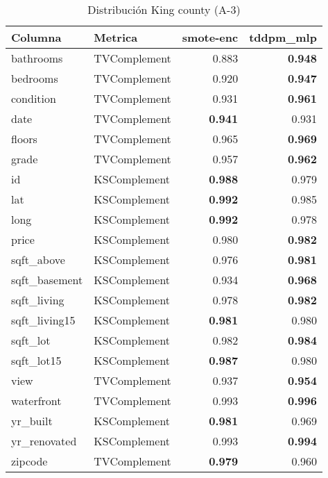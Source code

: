 \begin{table}[H]
\centering
\caption{Distribución King county (A-3)}
\label{table-shape-king county-a-3}
\begin{tabular}{|l|l|r|r|}
\hline
\rowcolor[gray]{0.8}
Columna & Metrica & smote-enc & tddpm\_mlp \\
\hline bathrooms & TVComplement & 0.883 & \bfseries 0.948 \\
\hline bedrooms & TVComplement & 0.920 & \bfseries 0.947 \\
\hline condition & TVComplement & 0.931 & \bfseries 0.961 \\
\hline date & TVComplement & \bfseries 0.941 & 0.931 \\
\hline floors & TVComplement & 0.965 & \bfseries 0.969 \\
\hline grade & TVComplement & 0.957 & \bfseries 0.962 \\
\hline id & KSComplement & \bfseries 0.988 & 0.979 \\
\hline lat & KSComplement & \bfseries 0.992 & 0.985 \\
\hline long & KSComplement & \bfseries 0.992 & 0.978 \\
\hline price & KSComplement & 0.980 & \bfseries 0.982 \\
\hline sqft\_above & KSComplement & 0.976 & \bfseries 0.981 \\
\hline sqft\_basement & KSComplement & 0.934 & \bfseries 0.968 \\
\hline sqft\_living & KSComplement & 0.978 & \bfseries 0.982 \\
\hline sqft\_living15 & KSComplement & \bfseries 0.981 & 0.980 \\
\hline sqft\_lot & KSComplement & 0.982 & \bfseries 0.984 \\
\hline sqft\_lot15 & KSComplement & \bfseries 0.987 & 0.980 \\
\hline view & TVComplement & 0.937 & \bfseries 0.954 \\
\hline waterfront & TVComplement & 0.993 & \bfseries 0.996 \\
\hline yr\_built & KSComplement & \bfseries 0.981 & 0.969 \\
\hline yr\_renovated & KSComplement & 0.993 & \bfseries 0.994 \\
\hline zipcode & TVComplement & \bfseries 0.979 & 0.960 \\
\hline
\end{tabular}
\end{table}
